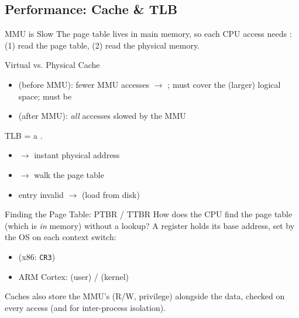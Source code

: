 \subsection{Performance: Cache \& TLB}

\begin{concept}{MMU is Slow}
    The page table lives in main memory, so each CPU access needs : (1) read the page table, (2) read the physical memory.
\end{concept}


\begin{definition}{Virtual vs. Physical Cache}
    \begin{itemize}
        \item {} (before MMU): fewer MMU accesses $\to$
              ; must cover the (larger) logical space; must be
        \item {} (after MMU): \emph{all} accesses slowed by
              the MMU
    \end{itemize}
\end{definition}

\begin{definition}{TLB}
     = a .
    \begin{itemize}
        \item {} $\to$ instant physical address
        \item {} $\to$ walk the page table
        \item entry invalid $\to$  (load from disk)
    \end{itemize}
\end{definition}

\multend

\begin{corollary}{Finding the Page Table: PTBR / TTBR}
    How does the CPU find the page table (which is \emph{in} memory) without a lookup?
    A register holds its  base address, set by the OS on each
    context switch:
    \begin{itemize}
        \item {} (x86: \texttt{CR3})
        \item ARM Cortex:  (user) /  (kernel)
    \end{itemize}
    Caches also store the MMU's  (R/W, privilege) alongside
    the data, checked on every access (and for inter-process isolation).
\end{corollary}


